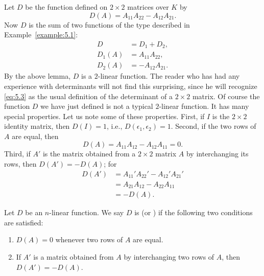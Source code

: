 \begin{example}\label{example:5.3}
    Let \(D\) be the function defined on \(2\times 2\) matrices over \(K\) by
    \begin{equation}
        D\left(A\right)=A_{11}A_{22}-A_{12}A_{21}.\label{eq:5.3}
    \end{equation}
    Now \(D\) is the sum of two functions of the type described in Example~\ref{example:5.1}:
    \begin{align*}
        D&=D_1+D_2,\\
        D_1\left(A\right)&=A_{11}A_{22},\\
        D_2\left(A\right)&=-A_{12}A_{21}.
    \end{align*}
    By the above lemma, \(D\) is a \(2\)-linear function. The reader who has had any experience with determinants will not find this surprising, since he will recognize \eqref{eq:5.3} as the usual definition of the determinant of a \(2\times2\) matrix. Of course the function \(D\) we have just defined is not a typical \(2\)-linear function. It has many special properties. Let us note some of these properties. First, if \(I\) is the \(2\times2\) identity matrix, then \(D\left(I\right)=1\), i.e., \(D\left(\epsilon_1,\epsilon_2\right)=1\). Second, if the two rows of \(A\) are equal, then
    \begin{equation*}
        D\left(A\right)=A_{11}A_{12}-A_{12}A_{11}=0.
    \end{equation*}
    Third, if \(A'\) is the matrix obtained from a \(2\times2\) matrix \(A\) by interchanging its rows, then \(D\left(A'\right)=-D\left(A\right)\); for
    \begin{align*}
        D\left(A'\right)&=A_{11}'A_{22}'-A_{12}'A_{21}'\\
        &=A_{21}A_{12}-A_{22}A_{11}\\
        &=-D\left(A\right).
    \end{align*}
\end{example}

\begin{definition}
    Let \(D\) be an \(n\)-linear function. We say \(D\) is  (or ) if the following two conditions are satisfied:
    \begin{enumerate}
        \item\label{itm:5.2.1} \(D\left(A\right)=0\) whenever two rows of \(A\) are equal.
        \item\label{itm:5.2.2} If \(A'\) is a matrix obtained from \(A\) by interchanging two rows of \(A\), then \(D\left(A'\right)=-D\left(A\right)\).
    \end{enumerate}
\end{definition}

